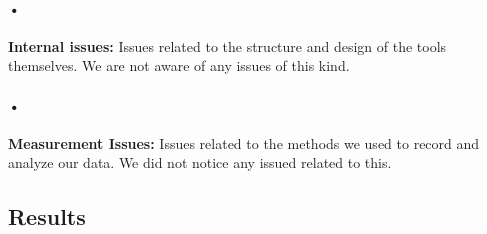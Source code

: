 \documentclass[twocolumn]{article}
\begin{document}
\paragraph{•}
	\textbf{Internal issues:} Issues related to the structure and design of the tools themselves. We are not aware of any issues of this kind.
\paragraph{•}
	\textbf{Measurement Issues:} Issues related to the methods we used to record and analyze our data. We did not notice any issued related to this.
	
\clearpage
\newpage

\subsection{Results}
\end{document}
